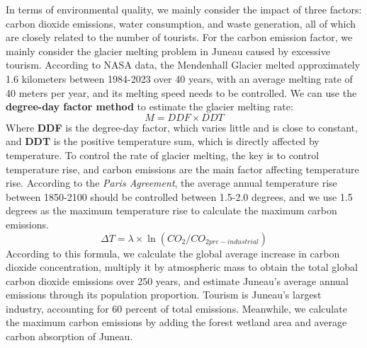 \documentclass[12pt]{article}  %
\begin{document}
In terms of environmental quality, we mainly consider the impact of three factors: carbon dioxide emissions, water consumption, and waste generation, all of which are closely related to the number of tourists.
For the carbon emission factor, we mainly consider the glacier melting problem in Juneau caused by excessive tourism. According to NASA data,\cite{6} the Mendenhall Glacier melted approximately 1.6 kilometers between 1984-2023 over 40 years, with an average melting rate of 40 meters per year, and its melting speed needs to be controlled. We can use the \textbf{degree-day factor method} to estimate the glacier melting rate:
\begin{equation}
    M=DDF\times DDT
\end{equation}
Where \textbf{DDF} is the degree-day factor, which varies little and is close to constant, and \textbf{DDT} is the positive temperature sum, which is directly affected by temperature. To control the rate of glacier melting, the key is to control temperature rise, and carbon emissions are the main factor affecting temperature rise. According to the \textit{Paris Agreement}, the average annual temperature rise between 1850-2100 should be controlled between 1.5-2.0 degrees, and we use 1.5 degrees as the maximum temperature rise to calculate the maximum carbon emissions.
\begin{equation}
    \Delta T=\lambda\times \ln(CO_{2}/CO_{2pre-industrial})
\end{equation}
According to this formula, we calculate the global average increase in carbon dioxide concentration, multiply it by atmospheric mass to obtain the total global carbon dioxide emissions over 250 years, and estimate Juneau's average annual emissions through its population proportion. Tourism is Juneau's largest industry, accounting for 60 percent of total emissions. Meanwhile, we calculate the maximum carbon emissions by adding the forest wetland area and average carbon absorption of Juneau.
\end{document}

